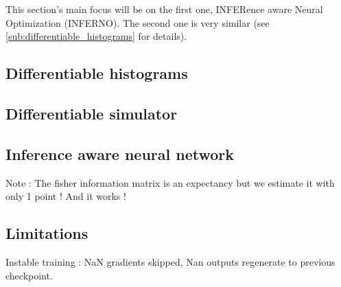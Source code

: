 This section's main focus will be on the first one, INFERence aware Neural Optimization (INFERNO).
The second one is very similar (see \autoref{sub:differentiable_histograms} for details).





\subsection{Differentiable histograms} %
\label{sub:differentiable_histograms}









\subsection{Differentiable simulator} %
\label{sub:differentiable_simulator}








\subsection{Inference aware neural network} %
\label{sub:inference_aware_neural_network}



Note : The fisher information matrix is an expectancy but we estimate it with only 1 point !  And it works !




\subsection{Limitations} %
\label{sub:limitations}




Instable training : NaN gradients skipped, Nan outputs regenerate to previous checkpoint.




